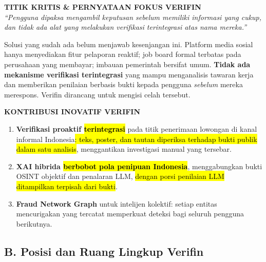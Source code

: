 \documentclass[12pt,a4paper]{article}
\newcommand{\revisi}[1]{\hl{#1}}
\begin{document}
\begin{tcolorbox}[colback=verfinblue!5, colframe=verfinblue!75, boxrule=0.8pt, arc=2mm, left=4mm, right=4mm, top=3mm, bottom=3mm]
\centering\small
\textcolor{verfinblue!90}{\textbf{TITIK KRITIS \& PERNYATAAN FOKUS VERIFIN}} \\[3pt]
\itshape ``Pengguna dipaksa mengambil keputusan sebelum memiliki informasi yang cukup, dan tidak ada alat yang melakukan verifikasi terintegrasi atas nama mereka.''
\end{tcolorbox}

Solusi yang sudah ada belum menjawab kesenjangan ini. Platform media sosial hanya menyediakan
fitur pelaporan reaktif; job board formal terbatas pada perusahaan yang membayar; imbauan
pemerintah bersifat umum. \textbf{Tidak ada mekanisme verifikasi terintegrasi} yang mampu
menganalisis tawaran kerja dan memberikan penilaian berbasis bukti kepada pengguna
\textit{sebelum} mereka merespons. Verifin dirancang untuk mengisi celah tersebut.

\begin{tcolorbox}[colback=verfingreen!5, colframe=verfingreen!60, boxrule=0.8pt, arc=2mm, left=4mm, right=4mm, top=3mm, bottom=3mm]
\centering\small
\textcolor{verfingreen!70!black}{\textbf{KONTRIBUSI INOVATIF VERIFIN}} \\[3pt]
\begin{minipage}{\linewidth}
\small
\begin{enumerate}[label=\textbf{\arabic*.}, leftmargin=0.6cm, itemsep=2pt]
\item \textbf{Verifikasi proaktif \revisi{terintegrasi}} pada titik penerimaan lowongan di kanal informal Indonesia\revisi{: teks, poster, dan tautan diperiksa terhadap bukti publik dalam satu analisis}, menggantikan investigasi manual yang tersebar.
\item \textbf{XAI hibrida \revisi{berbobot pola penipuan Indonesia}}, menggabungkan bukti OSINT objektif dan penalaran LLM, \revisi{dengan porsi penilaian LLM ditampilkan terpisah dari bukti}.
\item \textbf{Fraud Network Graph} untuk intelijen kolektif: setiap entitas mencurigakan yang tercatat memperkuat deteksi bagi seluruh pengguna berikutnya.
\end{enumerate}
\end{minipage}
\end{tcolorbox}

\subsection*{B. Posisi dan Ruang Lingkup Verifin}
\end{document}
